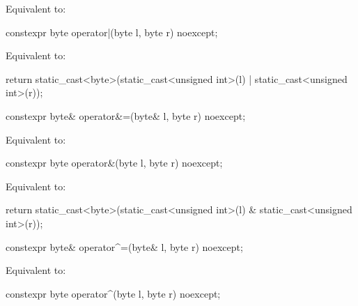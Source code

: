 \begin{itemdescr}
\pnum
\effects
Equivalent to: 
\end{itemdescr}

%
\begin{itemdecl}
constexpr byte operator|(byte l, byte r) noexcept;
\end{itemdecl}

\begin{itemdescr}
\pnum
\effects
Equivalent to:
\begin{codeblock}
return static_cast<byte>(static_cast<unsigned int>(l) | static_cast<unsigned int>(r));
\end{codeblock}
\end{itemdescr}

%
\begin{itemdecl}
constexpr byte& operator&=(byte& l, byte r) noexcept;
\end{itemdecl}

\begin{itemdescr}
\pnum
\effects
Equivalent to: 
\end{itemdescr}

%
\begin{itemdecl}
constexpr byte operator&(byte l, byte r) noexcept;
\end{itemdecl}

\begin{itemdescr}
\pnum
\effects
Equivalent to:
\begin{codeblock}
return static_cast<byte>(static_cast<unsigned int>(l) & static_cast<unsigned int>(r));
\end{codeblock}
\end{itemdescr}

%
\begin{itemdecl}
constexpr byte& operator^=(byte& l, byte r) noexcept;
\end{itemdecl}

\begin{itemdescr}
\pnum
\effects
Equivalent to: 
\end{itemdescr}

%
\begin{itemdecl}
constexpr byte operator^(byte l, byte r) noexcept;
\end{itemdecl}

